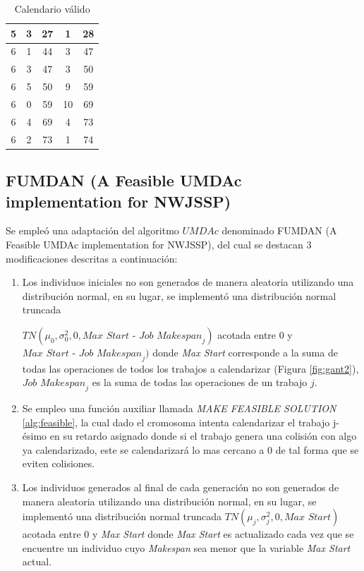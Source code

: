 \documentclass[12pt,a4paper]{article}
\begin{document}
\begin{table}[H]
\begin{tabular}{|c|c|c|c|c|}
5    &      3   &  27  &       1   &   28\\
\hline
6    &      1   &  44  &       3   &   47\\
6    &      3   &  47  &       3   &   50\\
6    &      5   &  50   &      9   &   59\\
6    &      0   &  59    &    10   &   69\\
6    &      4   &  69    &     4  &    73\\
6    &    2   &  73      &   1   &   74\\
\hline
    \end{tabular}
    \caption{Calendario válido}
    \label{tab:calendar}
\end{table}



\subsection{FUMDAN (A Feasible UMDAc implementation for NWJSSP)}

Se empleó una adaptación del algoritmo $UMDAc$  denominado FUMDAN (A Feasible UMDAc implementation for NWJSSP), del cual se destacan 3 modificaciones descritas a continuación:

\begin{enumerate}
    \item Los individuos iniciales no son generados de manera aleatoria utilizando una distribución normal, en su lugar, se implementó una distribución normal truncada 
    
    $TN(\mu_0,\sigma_{0}^{2},0,\textit{Max Start - Job Makespan}_j)$ acotada entre 0 y $\textit{Max Start - Job Makespan}_j)$ donde \textit{Max Start} corresponde a la suma de todas las operaciones de todos los trabajos a calendarizar (Figura \ref{fig:gant2}), ${\textit{Job Makespan}}_j$ es la suma de todas las operaciones de un trabajo $j$.
    \item Se empleo una función auxiliar llamada \textit{MAKE FEASIBLE SOLUTION} \ref{alg:feasible}, la cual dado el cromosoma intenta calendarizar el trabajo j-ésimo en su retardo asignado donde si el trabajo genera una colisión con algo ya calendarizado, este se calendarizará lo mas cercano a 0 de tal forma que se eviten colisiones. 
    \item Los individuos generados al final de cada generación no son generados de manera aleatoria utilizando una distribución normal, en su lugar, se implementó una distribución normal truncada $TN(\mu_j,\sigma_{j}^{2},0,\textit{Max Start})$ acotada entre 0 y \textit{Max Start} donde \textit{Max Start} es actualizado cada vez que se encuentre un individuo cuyo \textit{Makespan} sea menor que la variable \textit{Max Start} actual.
\end{enumerate}
\end{document}
